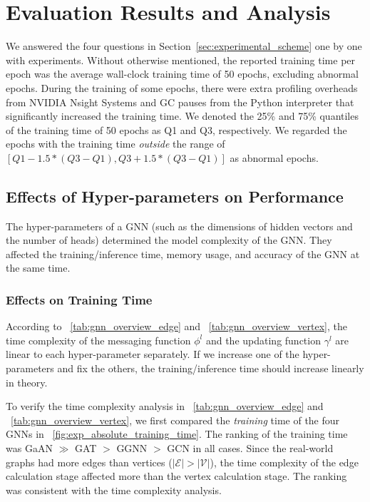 \section{Evaluation Results and Analysis}
\label{sec:experiment_results}

We answered the four questions in Section~\ref{sec:experimental_scheme} one by one with experiments.
%
Without otherwise mentioned, the reported training time per epoch was the average wall-clock training time of 50 epochs, excluding abnormal epochs.
%
During the training of some epochs, there were extra profiling overheads from NVIDIA Nsight Systems and GC pauses from the Python interpreter that significantly increased the training time.
%
We denoted the 25\% and 75\% quantiles of the training time of 50 epochs as Q1 and Q3, respectively.
%
We regarded the epochs with the training time \emph{outside} the range of $[Q1 - 1.5 * (Q3-Q1), Q3 + 1.5 * (Q3-Q1)]$ as abnormal epochs.

\subsection{Effects of Hyper-parameters on Performance}
\label{sec:effects_of_hyper-parameters_on_performance}

The hyper-parameters of a GNN (such as the dimensions of hidden vectors and the number of heads) determined the model complexity of the GNN.
%
They affected the training/inference time, memory usage, and accuracy of the GNN at the same time.


\subsubsection{Effects on Training Time}

According to \tablename~\ref{tab:gnn_overview_edge} and \tablename~\ref{tab:gnn_overview_vertex}, the time complexity of the messaging function $\phi^l$ and the updating function $\gamma^l$ are linear to each hyper-parameter separately.
%
If we increase one of the hyper-parameters and fix the others, the training/inference time should increase linearly in theory.

To verify the time complexity analysis in \tablename~\ref{tab:gnn_overview_edge} and \tablename~\ref{tab:gnn_overview_vertex}, we first compared the \emph{training} time of the four GNNs in \figurename~\ref{fig:exp_absolute_training_time}.
%
The ranking of the training time was GaAN $\gg$ GAT $>$ GGNN $>$ GCN in all cases.
%
Since the real-world graphs had more edges than vertices ($|\mathcal{E}| > |\mathcal{V}|$), the time complexity of the edge calculation stage affected more than the vertex calculation stage.
%
The ranking was consistent with the time complexity analysis.

